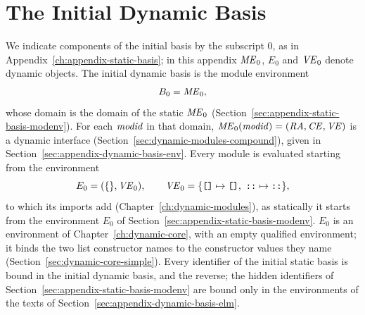 
\chapter{The Initial Dynamic Basis}\label{ch:appendix-dynamic-basis}

We indicate components of the initial basis by the subscript 0, as in
Appendix~\ref{ch:appendix-static-basis}; in this appendix $\mathit{ME}_0$, $E_0$ and
$\mathit{VE}_0$ denote dynamic objects. The initial dynamic basis is the module
environment
\[
  B_0=\mathit{ME}_0 ,
\]
whose domain is the domain of the static $\mathit{ME}_0$
(Section~\ref{sec:appendix-static-basis-modenv}). For each $\mathit{modid}$ in that
domain, $\mathit{ME}_0(\mathit{modid})=(\mathit{RA},\mathit{CE},\mathit{VE})$ is a dynamic interface
(Section~\ref{sec:dynamic-modules-compound}), given in
Section~\ref{sec:appendix-dynamic-basis-env}. Every module is evaluated
starting from the environment
\[
  E_0=(\{\},\mathit{VE}_0),\qquad
  \mathit{VE}_0=\{\textnormal{\texttt{[]}}\mapsto\textnormal{\texttt{[]}},\ \textnormal{\texttt{::}}\mapsto\textnormal{\texttt{::}}\},
\]
to which its imports add (Chapter~\ref{ch:dynamic-modules}), as statically it
starts from the environment $E_0$ of
Section~\ref{sec:appendix-static-basis-modenv}. $E_0$ is an environment of
Chapter~\ref{ch:dynamic-core}, with an empty qualified environment; it binds
the two list constructor names to the constructor values they name
(Section~\ref{sec:dynamic-core-simple}). %
Every identifier of the initial static basis is bound in the initial dynamic
basis, and the reverse; the hidden identifiers of
Section~\ref{sec:appendix-static-basis-modenv} are bound only in the
environments of the texts of Section~\ref{sec:appendix-dynamic-basis-elm}. %

